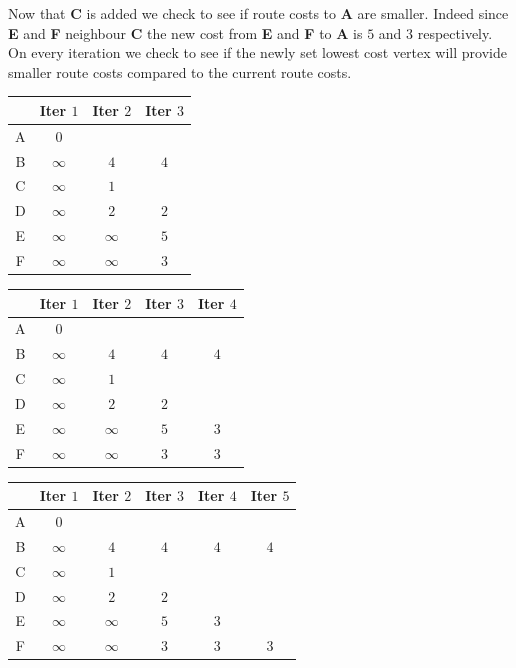 \documentclass{article}
\begin{document}
Now that {\bf C} is added we check to see if route costs to {\bf A} are smaller. Indeed since {\bf E} and {\bf F} neighbour {\bf C} the new cost from {\bf E} and {\bf F} to {\bf A} is $5$ and $3$ respectively. On every iteration we check to see if the newly set lowest cost vertex will provide smaller route costs compared to the current route costs.

\begin{center}
 \begin{tabular}{| c || c | c | c |} 
 \hline
 \, & Iter $1$ & Iter $2$ & Iter $3$ \\ [0.5ex] 
 \hline\hline
A & $0$ & \, & \, \\ 
 \hline
B & $\infty$ & $4$ & $4$ \\
 \hline
C & $\infty$ & $1$ & \, \\
 \hline
D & $\infty$ & $2$ & $2$ \\
 \hline
E & $\infty$ & $\infty$ & $5$ \\
 \hline
F & $\infty$ & $\infty$ & $3$ \\
 \hline
\end{tabular}
\end{center}

\begin{center}
 \begin{tabular}{| c || c | c | c | c |} 
 \hline
 \, & Iter $1$ & Iter $2$ & Iter $3$ & Iter $4$ \\ [0.5ex] 
 \hline\hline
A & $0$ & \, & \, & \, \\ 
 \hline
B & $\infty$ & $4$ & $4$ & $4$ \\
 \hline
C & $\infty$ & $1$ & \, & \, \\
 \hline
D & $\infty$ & $2$ & $2$ & \, \\
 \hline
E & $\infty$ & $\infty$ & $5$ & $3$ \\
 \hline
F & $\infty$ & $\infty$ & $3$ & $3$ \\
 \hline
\end{tabular}
\end{center}

\begin{center}
 \begin{tabular}{| c || c | c | c | c | c |} 
 \hline
 \, & Iter $1$ & Iter $2$ & Iter $3$ & Iter $4$ & Iter $5$ \\ [0.5ex] 
 \hline\hline
A & $0$ & \, & \, & \, & \, \\ 
 \hline
B & $\infty$ & $4$ & $4$ & $4$ & $4$ \\
 \hline
C & $\infty$ & $1$ & \, & \, & \, \\
 \hline
D & $\infty$ & $2$ & $2$ & \, & \, \\
 \hline
E & $\infty$ & $\infty$ & $5$ & $3$ & \, \\
 \hline
F & $\infty$ & $\infty$ & $3$ & $3$ & $3$ \\
 \hline
\end{tabular}
\end{center}
\end{document}
